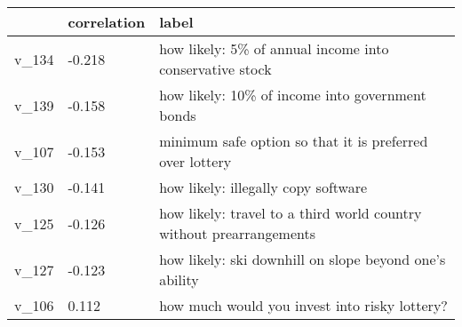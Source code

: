 \begin{tabular}{lll}
\hline
 & correlation & label \\
\hline
v\_134 & -0.218 & how likely: 5\% of annual income into conservative stock \\
v\_139 & -0.158 & how likely: 10\% of income into government bonds \\
v\_107 & -0.153 & minimum safe option so that it is preferred over lottery \\
v\_130 & -0.141 & how likely: illegally copy software \\
v\_125 & -0.126 & how likely: travel to a third world country without prearrangements \\
v\_127 & -0.123 & how likely: ski downhill on slope beyond one's ability \\
v\_106 & 0.112 & how much would you invest into risky lottery? \\
\hline
\end{tabular}
